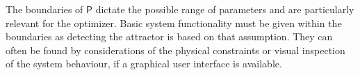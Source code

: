


    The boundaries of $\mathsf{P}$ dictate the possible range of parameters and are particularly relevant for the optimizer. Basic system functionality must be given within the boundaries as detecting the attractor is based on that assumption. They can often be found by considerations of the physical constraints or visual inspection of the system behaviour, if a graphical user interface is available.









